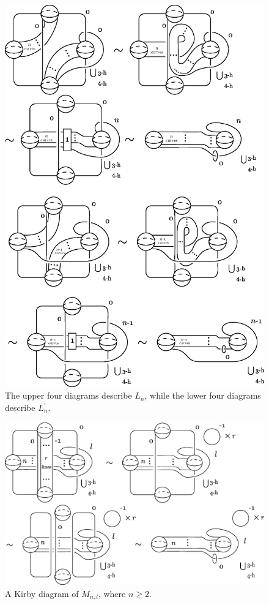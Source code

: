 \documentclass{amsart}
\theoremstyle{plain}
\theoremstyle{definition}
\begin{document}
\begin{figure}[htbp]
\begin{center}
\includegraphics[width=135mm]{movesL_n.eps}
\end{center}
\caption{The upper four diagrams describe $L_n$, while the lower four diagrams describe $L_n^\prime$. }
\label{movesL_n}
\end{figure}

\begin{figure}[t!]
\begin{center}
\includegraphics[width=145mm]{S_r-other.eps}
\end{center}
\caption{A Kirby diagram of $M_{n,l}$, where $n\geq 2$. }
\label{S_r-other}
\end{figure}
\end{document}
